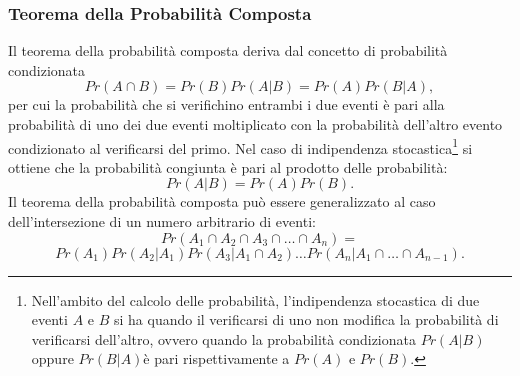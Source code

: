\documentclass[12pt,oneside,openany]{memoir}
\numberwithin{equation}{subsection}
\begin{document}
\subsubsection{Teorema della Probabilit\`a Composta}
Il teorema della probabilit\`a composta deriva dal concetto di probabilit\`a
condizionata
\begin{equation}
    Pr(A \cap B) = Pr(B) Pr(A|B) = Pr(A) Pr(B|A),
\end{equation}
per cui la probabilit\`a che si verifichino entrambi i due eventi \`e pari alla
probabilit\`a di uno dei due eventi moltiplicato con la probabilit\`a dell'altro
evento condizionato al verificarsi del primo.
\bigbreak\noindent
Nel caso di indipendenza stocastica\footnote{Nell'ambito del calcolo delle
probabilit\`a, l'indipendenza stocastica di due eventi $A$ e $B$ si ha quando il
verificarsi di uno non modifica la probabilit\`a di verificarsi dell'altro,
ovvero quando la probabilit\`a condizionata $Pr(A | B)$ oppure $Pr(B | A)$\`e
pari rispettivamente a $Pr(A)$ e $Pr(B)$.} si ottiene che la probabilit\`a
congiunta \`e pari al prodotto delle probabilit\`a:
\begin{equation}
    Pr(A|B) = Pr(A) Pr(B).
\end{equation}
\bigbreak\noindent
Il teorema della probabilit\`a composta può essere generalizzato al caso
dell'intersezione di un numero arbitrario di eventi:
\begin{equation}
    Pr(A_1 \cap A_2 \cap A_3 \cap \dots \cap A_n) =
\end{equation}
\[
    Pr(A_1) Pr(A_2 | A_1) Pr(A_3 | A_1 \cap A_2) \dots Pr(A_n | A_1 \cap \dots
    \cap A_{n-1}).
\]

\end{document}
